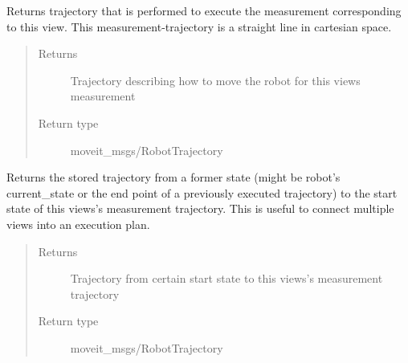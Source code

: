 \documentclass[letterpaper,10pt,english]{sphinxmanual}
\begin{document}
\begin{fulllineitems}
\begin{fulllineitems}
\end{fulllineitems}


\begin{fulllineitems}
\label{\detokenize{module_view:agiprobot_measurement.view.View.get_trajectory_for_measurement}}
Returns trajectory that is performed to execute the measurement corresponding to this view.
This measurement-trajectory is a straight line in cartesian space.
\begin{quote}\begin{description}
\item[{Returns}] \leavevmode
Trajectory describing how to move the robot for this views measurement

\item[{Return type}] \leavevmode
moveit\_msgs/RobotTrajectory

\end{description}\end{quote}

\end{fulllineitems}


\begin{fulllineitems}
\label{\detokenize{module_view:agiprobot_measurement.view.View.get_trajectory_to_view}}
Returns the stored trajectory from a former state (might be robot’s current\_state or the end point of a previously executed trajectory) to
the start state of this views’s measurement trajectory. This is useful to connect multiple views into an execution plan.
\begin{quote}\begin{description}
\item[{Returns}] \leavevmode
Trajectory from certain start state to this views’s measurement trajectory

\item[{Return type}] \leavevmode
moveit\_msgs/RobotTrajectory

\end{description}\end{quote}

\end{fulllineitems}


\end{fulllineitems}
\end{document}
